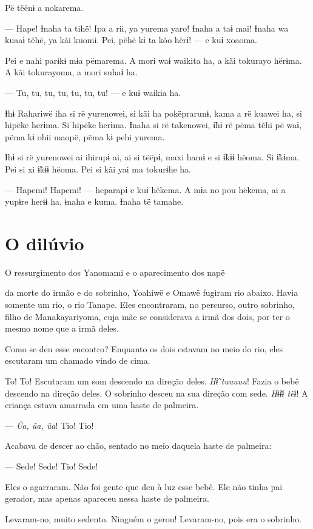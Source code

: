 Pë tëënɨ a nokarema. 

--- Hape! Ɨnaha ta tihë! Ipa a rii, ya yurema yaro! Ɨnaha a taɨ mai! Ɨnaha
wa kuaaɨ tëhë, ya kãi kuomi. Pei, pëhë kɨ ta kõo hërɨ! --- e kuɨ
xoaoma. 

Pei e nahi parɨkɨ mɨa pëmarema. A mori waɨ waikita ha, a kãi tokurayo
hërɨma. A kãi tokurayoma, a mori suhaɨ ha. 

--- Tu, tu, tu, tu, tu, tu, tu! --- e kuɨ waikia ha. 

Ɨhɨ Rahariwë iha si rë yurenowei, si kãi ha pokëprarunɨ, kama a rë
kuawei ha, si hipëke herɨma. Si hipëke herɨma. Ɨnaha si rë takenowei,
ɨ̃hɨ rë pëma tẽhi pë waɨ, pëma kɨ ohii maopë, pëma kɨ pehi yurema. 

Ɨhɨ si rë yurenowei ai ihirupɨ ai, ai si tëëpɨ, maxi hamɨ e si ɨ̃kɨɨ
hëoma. Si ɨ̃kɨma. Pei si xi ɨ̃kɨɨ hëoma. Pei si kãi yai ma tokurɨhe ha. 

--- Hapemi! Hapemi! --- heparapɨ e kuɨ hëkema. A mɨa no pou hëkema, ai a
yupɨre herɨɨ ha, ɨnaha e kuma. Ɨnaha të tamahe. 

\chapter{O dilúvio}{O ressurgimento dos Yanomami e o aparecimento dos napë}

 da morte do irmão e do sobrinho, Yoahiwë e Omawë fugiram rio
abaixo. Havia somente um rio, o rio Tanape. Eles encontraram, no
percurso, outro sobrinho, filho de Manakayariyoma, cuja mãe se
considerava a irmã dos dois, por ter o mesmo nome que a irmã deles. 

Como se deu esse encontro? Enquanto os dois estavam no meio do rio, eles
escutaram um chamado vindo de cima. 

To! To! Escutaram um som descendo na direção deles. \textit{Hɨ̃ tuuuuu}! Fazia o
bebê descendo na direção deles. O sobrinho desceu na sua direção com
sede. \textit{Hɨ̃ɨɨ tëɨ}! A criança estava amarrada em uma haste de palmeira.

--- \textit{Ũa, ũa, ũa}! Tio! Tio!

Acabava de descer ao chão, sentado no meio daquela haste de palmeira:

--- Sede! Sede! Tio! Sede!

Eles o agarraram. Não foi gente que deu à luz esse bebê. Ele não
tinha pai gerador, mas apenas apareceu nessa haste de palmeira. 

Levaram-no, muito sedento. Ninguém o gerou! Levaram-no, pois era o
sobrinho. 

